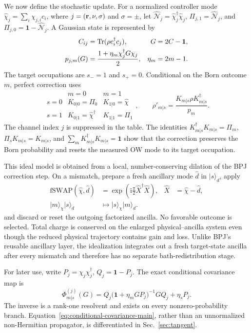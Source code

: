 \documentclass[aps,prx,twocolumn,superscriptaddress,longbibliography,nofootinbib,floatfix]{revtex4-2}
\newcommand{\ii}{\boldsymbol{\mathrm{i}}}
\newcommand{\mc}[1]{\mathcal{#1}}
\newcommand{\mr}[1]{\mathrm{#1}}
\newcommand{\h}[1]{\hat{#1}}
\newcommand{\Id}{\mathbf{1}}
\newcommand{\hcN}{\h{\mc{N}}}
\newcommand{\bfr}{{\bf r}}
\newcommand{\fSWAP}{\mr{fSWAP}}
\begin{document}
We now define the stochastic update.  For a normalized controller mode
\(\h\chi_j=\sum_i\chi_{j,i}c_i\), where
\(j=(\bfr,\nu,\sigma)\) and \(\sigma=\pm\), let
\(\hcN_j=\h\chi_j^\dagger\h\chi_j\),
\(\Pi_{j,1}=\hcN_j\), and \(\Pi_{j,0}=\Id-\hcN_j\).  A Gaussian state is
represented by
\begin{align}
 C_{ij}&=\Tr(\rho c_i^\dagger c_j),
 &G&=2C-\Id,
 \nonumber\\
 p_{j,m}(G)&=\frac{1+\eta_m\chi_j^\dagger G\chi_j}{2},
 &\eta_m&=2m-1.
 \label{eq:covariance-and-born-rule}
\end{align}
The target occupations are \(s_-=1\) and \(s_+=0\).  Conditional on the Born
outcome \(m\), perfect correction uses
\begin{equation}
 \begin{array}{c|cc}
  &m=0&m=1\\ \hline
  s=0&K_{0|0}=\Pi_0&K_{1|0}=\h\chi\\[1mm]
  s=1&K_{0|1}=\h\chi^\dagger&K_{1|1}=\Pi_1
 \end{array},
 \qquad
 \rho'_{m|s}=\frac{K_{m|s}\rho K_{m|s}^\dagger}{p_m}.
 \label{eq:main-perfect-correction-kraus}
\end{equation}
The channel index \(j\) is suppressed in the table.  The identities
\(K_{m|s}^\dagger K_{m|s}=\Pi_m\),
\(\Pi_sK_{m|s}=K_{m|s}\), and
\(\sum_mK_{m|s}^\dagger K_{m|s}=\Id\) show that the correction preserves the
Born probability and resets the measured OW mode to its target occupation.

This ideal model is obtained from a local, number-conserving dilation of the
BPJ correction step.  On a mismatch, prepare a fresh ancillary mode
\(\h d\) in \(\lvert s\rangle_d\), apply
\begin{align}
 \fSWAP(\h\chi,\h d)
 &=\exp\!\left(\ii\frac{\pi}{2}\h X^\dagger\h X\right),
 &\h X&=\h\chi-\h d,
 \nonumber\\
 \lvert m\rangle_\chi\lvert s\rangle_d
 &\longmapsto
 \lvert s\rangle_\chi\lvert m\rangle_d.
 \label{eq:main-fswap-dilation}
\end{align}
and discard or reset the outgoing factorized ancilla.  No favorable outcome
is selected.  Total charge is conserved on the enlarged physical--ancilla
system even though the reduced physical trajectory contains gain and loss.
Unlike BPJ's reusable ancillary layer, the idealization integrates out a
fresh target-state ancilla after every mismatch and therefore has no separate
bath-redistribution stage.

For later use, write \(P_j=\chi_j\chi_j^\dagger\),
\(Q_j=\Id-P_j\).  The exact conditional covariance map is
\begin{equation}
 \boxed{\Phi^{(j)}_{m|s}(G)=
 Q_j\bigl(\Id+\eta_mGP_j\bigr)^{-1}GQ_j+\eta_sP_j.}
 \label{eq:conditional-covariance-main}
\end{equation}
The inverse is a rank-one resolvent and exists on every nonzero-probability
branch.  Equation~\eqref{eq:conditional-covariance-main}, rather than an
unnormalized non-Hermitian propagator, is differentiated in
Sec.~\ref{sec:tangent}.
\end{document}
